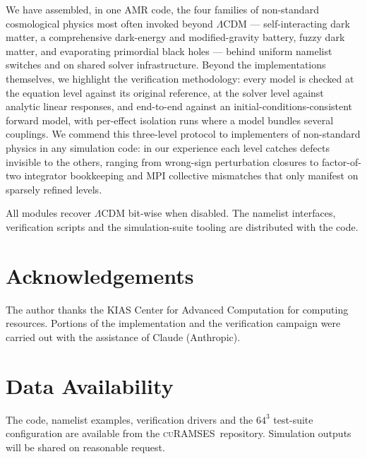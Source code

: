\documentclass[11pt,a4paper]{article}
\newcommand{\curamses}{\textsc{cuRAMSES}}
\begin{document}
We have assembled, in one AMR code, the four families of
non-standard cosmological physics most often invoked beyond
$\Lambda$CDM --- self-interacting dark matter, a comprehensive
dark-energy and modified-gravity battery, fuzzy dark matter, and
evaporating primordial black holes --- behind uniform namelist
switches and on shared solver infrastructure. Beyond the
implementations themselves, we highlight the verification
methodology: every model is checked at the equation level against
its original reference, at the solver level against analytic
linear responses, and end-to-end against an
initial-conditions-consistent forward model, with per-effect
isolation runs where a model bundles several couplings. We commend
this three-level protocol to implementers of non-standard physics
in any simulation code: in our experience each level catches
defects invisible to the others, ranging from wrong-sign
perturbation closures to factor-of-two integrator bookkeeping and
MPI collective mismatches that only manifest on sparsely refined
levels.

All modules recover $\Lambda$CDM bit-wise when disabled. The
namelist interfaces, verification scripts and the simulation-suite
tooling are distributed with the code.

\section*{Acknowledgements}
The author thanks the KIAS Center for Advanced Computation for
computing resources. Portions of the implementation and the
verification campaign were carried out with the assistance of
Claude (Anthropic).

\section*{Data Availability}
The code, namelist examples, verification drivers and the
$64^3$ test-suite configuration are available from the
\curamses\ repository. Simulation outputs will be shared on
reasonable request.
\end{document}
